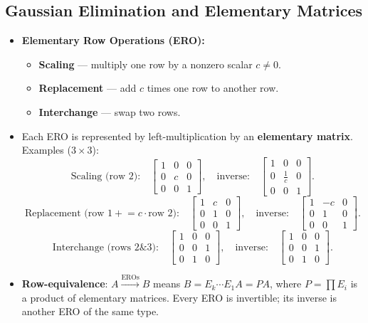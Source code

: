 \documentclass[hidelinks]{article}
\begin{document}
\subsection{Gaussian Elimination and Elementary Matrices}
\begin{itemize}
    \item \textbf{Elementary Row Operations (ERO):}
    \begin{itemize}
        \item \textbf{Scaling} — multiply one row by a nonzero scalar $c \neq 0$.
        \item \textbf{Replacement} — add $c$ times one row to another row.
        \item \textbf{Interchange} — swap two rows.
    \end{itemize}
    \item Each ERO is represented by left-multiplication by an \textbf{elementary matrix}. Examples ($3\times 3$):
    \[
        \text{Scaling (row 2):}\quad
        \begin{bmatrix}1&0&0\\0&c&0\\0&0&1\end{bmatrix},\quad
        \text{inverse:}\quad
        \begin{bmatrix}1&0&0\\0&\tfrac{1}{c}&0\\0&0&1\end{bmatrix}.
    \]
    \[
        \text{Replacement (row 1} \mathrel{+}= c \cdot \text{row 2):}\quad
        \begin{bmatrix}1&c&0\\0&1&0\\0&0&1\end{bmatrix},\quad
        \text{inverse:}\quad
        \begin{bmatrix}1&-c&0\\0&1&0\\0&0&1\end{bmatrix}.
    \]
    \[
        \text{Interchange (rows 2\&3):}\quad
        \begin{bmatrix}1&0&0\\0&0&1\\0&1&0\end{bmatrix},\quad
        \text{inverse:}\quad
        \begin{bmatrix}1&0&0\\0&0&1\\0&1&0\end{bmatrix}.
    \]
    \item \textbf{Row-equivalence}: $A \xrightarrow{\text{EROs}} B$ means $B = E_k \cdots E_1 A = PA$, where $P = \prod E_i$ is a product of elementary matrices. Every ERO is invertible; its inverse is another ERO of the same type.

\end{itemize}
\end{document}
